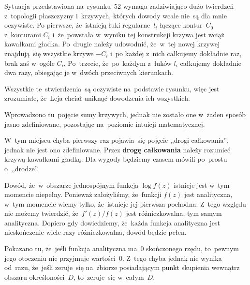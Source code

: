 \documentclass[a4paper,11pt]{article}
\begin{document}
\start {} Sytuacja przedstawiona na~rysunku~52 wymaga
zadziwiająco dużo twierdzeń z~topologii płaszczyzny i~krzywych,
których dowody wcale nie~są dla mnie oczywiste. Po pierwsze,
że~istnieją łuki regularne~$l_{ i }$ łączące kontur~$C_{ 0 }$
z~konturami $C_{ i }$ i~że~powstała w~wyniku tej konstrukcji krzywa
jest wciąż kawałkami gładka. Po~drugie należy udowodnić, że~w~tej
nowej krzywej znajdują~się wszystkie krzywe $-C_{ i }$ i~po każdej
z~nich całkujemy dokładnie raz, brak zaś w~ogóle $C_{ i }$.
Po~trzecie, że~po~każdym z~łuków $l_{ i }$ całkujemy dokładnie dwa
razy, obiegając je w~dwóch przeciwnych kierunkach.

Wszystkie te~stwierdzenia~są oczywiste na~podstawie rysunku, więc jest
zrozumiałe, że~Leja chciał uniknąć dowodzenia ich wszystkich.

\vspace{\spaceFour}


\start {} Wprowadzono tu~pojęcie sumy krzywych, jednak nie
zostało one w~żaden sposób jasno zdefiniowane, pozostając na~poziomie
intuicji matematycznej.

\vspace{\spaceFour}


\start {} W~tym miejscu chyba pierwszy raz pojawia~się pojęcie
,,drogi całkowania'', jednak nie jest ono zdefiniowane. Przez
\textbf{drogę całkowania} należy rozumieć krzywą kawałkami gładką. Dla
wygody będziemy czasem mówili po~prostu o~,,drodze''.

\vspace{\spaceFour}


\start {} Dowód, że~w~obszarze jednospójnym funkcja
$\log f( z )$ istnieje jest w~tym momencie niepełny. Ponieważ
założyliśmy, że~funkcji $f( z )$ jest analityczna, w~tym momencie
wiemy tylko, że~istnieje jej pierwsza pochodna. Z~tego względu nie
możemy twierdzić, że~$f'( z ) / f( z )$ jest różniczkowalna, tym samym
analityczna. Dopiero gdy dowiedziemy, że~każda funkcja analityczna
jest nieskończenie wiele razy różniczkowalna, dowód będzie pełen.

\vspace{\spaceFour}


\start {} Pokazano tu, że~jeśli funkcja analityczna ma~0
skończonego rzędu, to~pewnym jego otoczeniu nie przyjmuje wartości~0.
Z~tego chyba jednak nie wynika od~razu, że~jeśli zeruje~się na~zbiorze
posiadającym punkt skupienia wewnątrz obszaru określoności~$D$,
to~zeruje~się w~całym~$D$.
\end{document}
